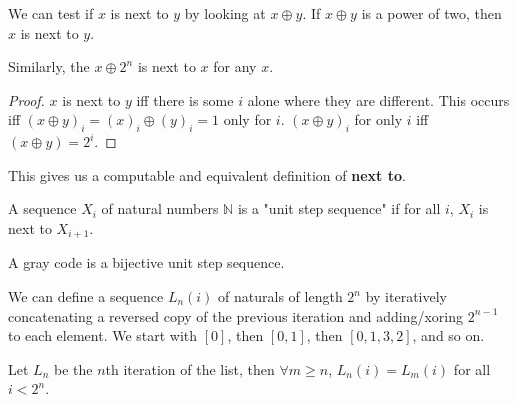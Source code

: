 \begin{theorem}
    \label{thm:next_to_xor_two_pow}
    \leanok
    We can test if $x$ is next to $y$ by looking at $x \oplus y$. If $x \oplus y$ is a
    power of two, then $x$ is next to $y$.

    Similarly, the $x \oplus 2^n$ is next to $x$ for any $x$.
\end{theorem}

\begin{proof}
    \leanok
    $x$ is next to $y$ iff there is some $i$ alone where they are different.
    This occurs iff $(x \oplus y)_i = (x)_i \oplus (y)_i = 1$ only for $i$.
    $(x \oplus y)_i$ for only $i$ iff $(x \oplus y) = 2^i$.
\end{proof}

\begin{definition}
    \label{def:computable_next_to}

    This gives us a computable and equivalent definition of \textbf{next to}.
\end{definition}

\begin{definition}
    \label{def:unit_step_sequence}
    A sequence $X_i$ of natural numbers $\mathbb{N}$ is a "unit step sequence" if
    for all $i$, $X_i$ is next to $X_{i+1}$.
\end{definition}

\begin{definition}
    \label{def:gray_code}

    A gray code is a bijective unit step sequence.
\end{definition}

\begin{definition}
    \label{def:list_gray_code}

    We can define a sequence $L_n(i)$ of naturals of length $2^n$ by iteratively concatenating
    a reversed copy of the previous iteration and adding/xoring $2^{n-1}$ to each element.
    We start with $[0]$, then $[0, 1]$, then $[0, 1, 3, 2]$, and so on.
\end{definition}

\begin{theorem}
    \label{thm:list_is_stable}

    Let $L_n$ be the $n$th iteration of the list, then $\forall m \ge n$, $L_n(i) = L_m(i)$ for all $i < 2^n$.
\end{theorem}

